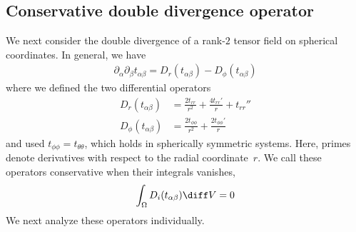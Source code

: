 \documentclass[
	superscriptaddress,
	twocolumn,
	aps, pre
]{revtex4-1}
\begin{document}
\subsection{Conservative double divergence operator}
We next consider the double divergence of a rank-$2$ tensor field on spherical coordinates.
In general, we have
\begin{align}
	\partial_\alpha\partial_\beta t_{\alpha\beta} = D_r(t_{\alpha\beta}) - D_\phi(t_{\alpha\beta})
\end{align}
where we defined the two differential operators 
\begin{subequations}
\begin{align}
	D_r(t_{\alpha\beta}) &= 
	 \frac{2 t_{rr}}{r^2} + \frac{4 t_{rr}'}{r} + t_{rr}''
\\
	D_\phi(t_{\alpha\beta}) &= \frac{2 t_{\phi \phi}}{r^2} + \frac{2t_{\phi \phi }'}{r}
\end{align}
\end{subequations}
and used $t_{\phi\phi}=t_{\theta\theta}$, which holds in spherically symmetric systems.
Here, primes denote derivatives with respect to the radial coordinate~$r$.
We call these operators conservative when their integrals vanishes,
\begin{align}
	\int_\Omega D_i(t_{\alpha\beta}) \diff V  = 0 
\end{align}
We next analyze these operators individually.
\end{document}
